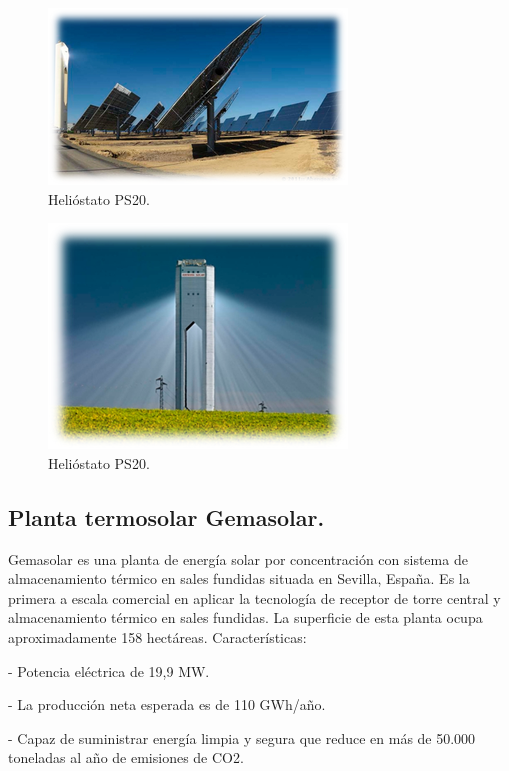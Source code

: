 \begin{figure}[h!]
  	\centering
	\includegraphics[scale=1]{FotosPaginasWebHeliostatos/unnamed(2).png}
	\caption{Helióstato PS20.
	\label{fig:FotosPaginasWebHeliostatos/unnamed(2).png}}
\end{figure}

\begin{figure}[h!]
  	\centering
	\includegraphics[scale=1]{FotosPaginasWebHeliostatos/unnamed(3).png}
	\caption{Helióstato PS20.
	\label{fig:FotosPaginasWebHeliostatos/unnamed(3).png}}
\end{figure}

\cite{ValenticampderrosWebSite}

\subsection{Planta termosolar Gemasolar.}

Gemasolar es una planta de energía solar por concentración con sistema de almacenamiento térmico en sales fundidas situada en Sevilla, España. Es la primera a escala comercial en aplicar la tecnología de receptor de torre central y almacenamiento térmico en sales fundidas. La superficie de esta planta ocupa aproximadamente 158 hectáreas. Características:

- Potencia eléctrica de 19,9 MW.

- La producción neta esperada es de 110 GWh/año.

- Capaz de suministrar energía limpia y segura que reduce en más de 50.000 toneladas al año de emisiones de CO2.

